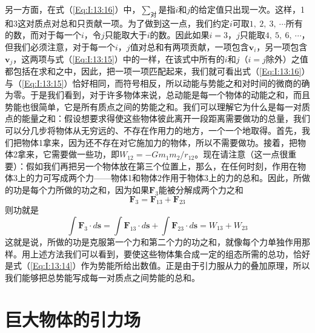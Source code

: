 另一方面，在式（\ref{Eq:I:13:16}）中，$\sum_{\text{对}}$是指$i$和$j$的给定值只出现一次。这样，1和3这对质点对总和只贡献一项。为了做到这一点，我们约定$i$可取$1,~2,~3,~\cdots$所有的数，而对于每一个$i$，令$j$只能取大于$i$的数。因此如果$i=3$，$j$只能取$4,~5,~6,~\cdots$，但我们必须注意，对于每一个$i$，$j$值对总和有两项贡献，一项包含$\boldsymbol{v}_i$，另一项包含$\boldsymbol{v}_j$，这两项与式（\ref{Eq:I:13:15}）中的一样，在该式中所有的$i$和$j$（$i=j$除外）之值都包括在求和之中，因此，把一项一项匹配起来，我们就可看出式（\ref{Eq:I:13:16}）与（\ref{Eq:I:13:15}）恰好相同，而符号相反，所以动能与势能之和对时间的微商的确为零。于是我们看到，对于许多物体来说，总动能是每一个物体的动能之和，而且势能也很简单，它是所有质点之间的势能之和。我们可以理解它为什么是每一对质点的能量之和：假设想要求得使这些物体彼此离开一段距离需要做功的总量，我们可以分几步将物体从无穷远的、不存在作用力的地方，一个一个地取得。首先，我们把物体1拿来，因为还不存在对它施加力的物体，所以不需要做功。接着，把物体2拿来，它需要做一些功，即$W_{12}=-Gm_1m_2/r_{12}$。现在请注意（这一点很重要）：假如我们再把另一个物体放在第三个位置上，那么，在任何时刻，作用在物体3上的力可写成两个力——物体1和物体2作用于物体3上的力的总和。因此，所做的功是每个力所做的功之和，因为如果$\boldsymbol{F}_3$能被分解成两个力之和
\begin{equation*}
    \boldsymbol{F}_3 = \boldsymbol{F}_{13}+\boldsymbol{F}_{23}
\end{equation*}
则功就是
\begin{equation*}
    \int \boldsymbol{F}_3 \cdot d\boldsymbol{s} = \int \boldsymbol{F}_{13} \cdot d\boldsymbol{s} + \int \boldsymbol{F}_{23} \cdot d\boldsymbol{s} = W_{13} + W_{23}
\end{equation*}
这就是说，所做的功是克服第一个力和第二个力的功之和，就像每个力单独作用那样。用上述方法我们可以看到，要使这些物体集合成一定的组态所需的总功，恰好是式（\ref{Eq:I:13:14}）作为势能所给出数值。正是由于引力服从力的叠加原理，所以我们能够把总势能写成每一对质点之间势能的总和。

\section{巨大物体的引力场}


